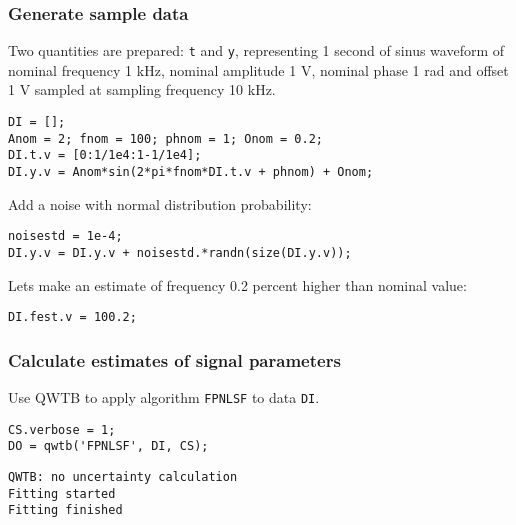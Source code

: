 \startcontents[localtoc]



{}
\subsubsection*{Generate sample data}



Two quantities are prepared: \texttt{t} and \texttt{y}, representing 1 second of sinus waveform of nominal
frequency 1 kHz, nominal amplitude 1 V, nominal phase 1 rad and offset 1 V sampled at sampling
frequency 10 kHz.

\begin{lstlisting}
DI = [];
Anom = 2; fnom = 100; phnom = 1; Onom = 0.2;
DI.t.v = [0:1/1e4:1-1/1e4];
DI.y.v = Anom*sin(2*pi*fnom*DI.t.v + phnom) + Onom;
\end{lstlisting}


Add a noise with normal distribution probability:

\begin{lstlisting}
noisestd = 1e-4;
DI.y.v = DI.y.v + noisestd.*randn(size(DI.y.v));
\end{lstlisting}


Lets make an estimate of frequency 0.2 percent higher than nominal value:

\begin{lstlisting}
DI.fest.v = 100.2;
\end{lstlisting}


{}
\subsubsection*{Calculate estimates of signal parameters}



Use QWTB to apply algorithm \texttt{FPNLSF} to data \texttt{DI}.

\begin{lstlisting}
CS.verbose = 1;
DO = qwtb('FPNLSF', DI, CS);
\end{lstlisting}
\begin{lstlisting}[language={},xleftmargin=5pt,frame=none]
QWTB: no uncertainty calculation
Fitting started
Fitting finished

\end{lstlisting}


